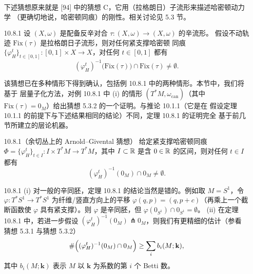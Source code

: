 下述猜想原来就是 [94] 中的猜想 C，它用（拉格朗日）子流形来描述哈密顿动力学
（更确切地说，哈密顿同痕）的刚性。相关讨论见 5.3 节。

\begin{wconj}{10.8.1}
  设 $(X,\omega)$ 是配备反辛对合 $\tau\colon(X,\omega)\to(X,\omega)$ 的辛流形。
  假设不动轨迹 $\mathrm{Fix}(\tau)$ 是拉格朗日子流形，则对任何紧支撑哈密顿
  同痕 $\{\varphi_H^t\}_{t\in[0,1]}\colon[0,1]\times X\to X$，对任何
  $t\in[0,1]$ 都有
  \[
    (\varphi_H^t)^{-1}\bigl(\mathrm{Fix}(\tau)\bigr)\cap\mathrm{Fix}(\tau)
    \ne\emptyset.
  \]
\end{wconj}

该猜想已在多种情形下得到确认，包括例 10.8.1 中的两种情形。本节中，我们将基于
层量子化方法，对例 10.8.1 中 (i) 的情形 $(T^*M,\omega_{\mathrm{can}})$（其中
$\mathrm{Fix}(\tau)=0_M$）给出猜想 5.3.2 的一个证明。与推论 10.1.1（它是在
假设定理 10.1.1 的前提下与下述结果相同的结论）不同，定理 10.8.1 的证明完全
基于前几节所建立的层论机器。


\begin{wthm}{10.8.1（余切丛上的 Arnold--Givental 猜想）}
  给定紧支撑哈密顿同痕
  $\Phi=\{\varphi_H^t\}_{t\in I}\colon I\times T^*M\to T^*M$，其中
  $I\subset\mathbb{R}$ 是含 $0\in\mathbb{R}$ 的区间，则对任何 $t\in I$ 都有
  \[
    (\varphi_H^t)^{-1}(0_M)\cap0_M\ne\emptyset.
  \]
\end{wthm}

\begin{wrem}{10.8.1}
  (i) 对一般的辛同胚，定理 10.8.1 的结论当然是错的。例如取 $M=S^1$，令
  $\varphi\colon T^*S^1\to T^*S^1$ 为纤维/竖直方向上的平移
  $\varphi(q,p)=(q,p+c)$（再乘上一个截断函数使 $\varphi$ 具有紧支撑）。则
  $\varphi$ 是辛同胚，但 $\varphi(0_{S^1})\cap0_{S^1}=\emptyset$。
  (ii) 在定理 10.8.1 中，若进一步假设
  $(\varphi_H^t)^{-1}(0_M)\pitchfork0_M$，则我们有更精细的估计（参看
  猜想 5.3.1 与猜想 5.3.2）
  \[
    \#\Bigl((\varphi_H^t)^{-1}(0_M)\cap0_M\Bigr)\ge\sum_i b_i(M;\mathbf{k}),
  \]
  其中 $b_i(M;\mathbf{k})$ 表示 $M$ 以 $\mathbf{k}$ 为系数的第 $i$ 个 Betti 数。
\end{wrem}


